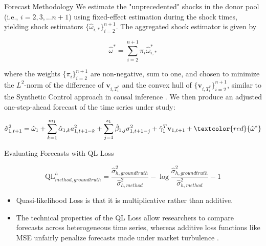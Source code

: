 \documentclass{beamer} %
\newcommand{\x}{\textbf{v}}
\begin{document}
\begin{frame}[t]
\begin{columns}[t]
\begin{column}{0.465\textwidth}
\begin{block}{Forecast Methodology}
We estimate the "unprecedented" shocks in the donor pool (i.e., $i = 2,3,...n+1$) using fixed-effect estimation during the shock times, yielding shock estimators $\{\hat\omega_{i,*}\}_{i=2}^{n+1}$.  The aggregated shock estimator is given by

\begin{equation}
	\hat\omega^{*} = \sum^{n+1}_{i=2}\pi_{i}\hat\omega^{*}_{i,*}
\end{equation}

where the weights $\{\pi_{i}\}_{i=2}^{n+1}$ are non-negative, sum to one, and chosen to minimize the $L^{2}$-norm of the difference of $\x_{i,T^{*}_{i}}$ and the convex hull of $\{\x_{i,T^{*}_{i}}\}^{n+1}_{i=2}$, similar to the Synthetic Control approach in causal inference \cite{abadie2003economic,abadie2010synthetic}.  We then produce an adjusted one-step-ahead forecast of the time series under study:


\begin{equation}
	\hat\sigma^{2}_{1,t+1} = \hat\omega_{1} + \sum^{m_{1}}_{k=1}\hat\alpha_{1,k}a^{2}_{1,t+1-k} + \sum_{j=1}^{s_{1}}\hat\beta_{1,j}\sigma_{1,t+1-j}^{2} + \hat\gamma_{1}^{T} \x_{1,t+1} + \textcolor{red}{\hat\omega^{*}}
\end{equation}

\end{block}


\begin{block}{Evaluating Forecasts with QL Loss}
	
\begin{equation}
\text{QL}^{h}_{method, ground truth} = \frac{\hat\sigma^{2}_{h, ground truth}}{ \hat\sigma^{2}_{h, method}} - \log{\frac{\hat\sigma^{2}_{h, ground truth}}{ \hat\sigma^{2}_{h, method}}} -1 
\end{equation}




	\begin{itemize}
		\item Quasi-likelihood Loss is that it is multiplicative rather than additive.
		\item The technical properties of the QL Loss allow researchers to compare forecasts across heterogeneous time series, whereas additive loss functions like MSE unfairly penalize forecasts made under market turbulence \cite{brownlees2011practical}.


\end{itemize}
\end{block}
\end{column}
\end{columns}
\end{frame}
\end{document}
